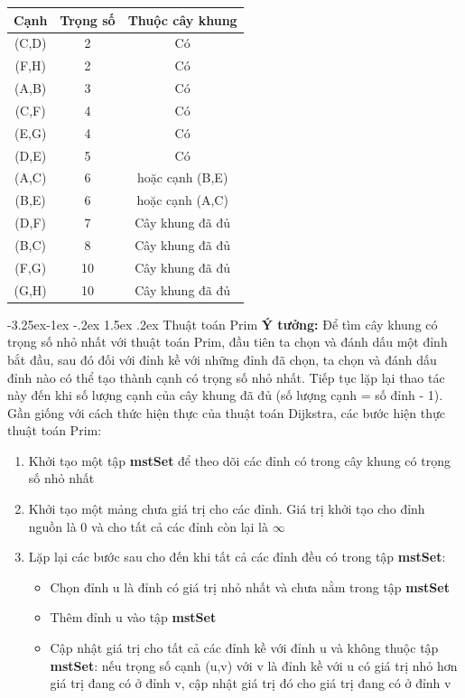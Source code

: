 \documentclass[a4paper]{article}
\makeatletter
\newcounter {subsubsubsection}[subsubsection]
\newcommand\subsubsubsection{\@startsection{subsubsubsection}{4}{\z@}%
                                     {-3.25ex\@plus -1ex \@minus -.2ex}%
                                     {1.5ex \@plus .2ex}%
                                     {\normalfont\normalsize\bfseries}}
\makeatother
\begin{document}
\begin{center}
\begin{tabular}{||c c c||} 
 \hline
Cạnh & Trọng số & Thuộc cây khung  \\ [0.5ex] 
 \hline\hline
 (C,D) & 2 & Có \\ 
 \hline
 (F,H) & 2 & Có\\
 \hline
 (A,B) & 3 & Có\\
 \hline
 (C,F) & 4 & Có\\
 \hline
 (E,G) & 4 & Có\\
 \hline
 (D,E) & 5 & Có\\
 \hline
 (A,C) & 6 & hoặc cạnh (B,E)\\
 \hline
 (B,E) & 6 & hoặc cạnh (A,C)\\
 \hline
 (D,F) & 7 & Cây khung đã đủ\\
 \hline
 (B,C) & 8 & Cây khung đã đủ\\
 \hline
 (F,G) & 10 & Cây khung đã đủ\\
 \hline
 (G,H) & 10 & Cây khung đã đủ\\

 \hline
\end{tabular}
\end{center}
            \subsubsubsection{Thuật toán Prim}
\textbf{Ý tưởng:} Để tìm cây khung có trọng số nhỏ nhất với thuật toán Prim, đầu tiên ta chọn và đánh dấu một đỉnh bắt đầu, sau đó đối với đỉnh kề với những đỉnh đã chọn, ta chọn và đánh dấu đỉnh nào có thể tạo thành cạnh có trọng số nhỏ nhất. Tiếp tục lặp lại thao tác này đến khi số lượng cạnh của cây khung đã đủ (số lượng cạnh = số đỉnh - 1). Gần giống với cách thức hiện thực của thuật toán Dijkstra, các bước hiện thực thuật toán Prim:
\begin{enumerate}
    \item Khởi tạo một tập \textbf{mstSet} để theo dõi các đỉnh có trong cây khung có trọng số nhỏ nhất
    \item Khởi tạo một mảng chưa giá trị cho các đỉnh. Giá trị khởi tạo cho đỉnh nguồn là 0 và cho tất cả các đỉnh còn lại là $\infty$
    \item Lặp lại các bước sau cho đến khi tất cả các đỉnh đều có trong tập \textbf{mstSet}:
    \begin{itemize}
        \item Chọn đỉnh u là đỉnh có giá trị nhỏ nhất và chưa nằm trong tập \textbf{mstSet}
        \item Thêm đỉnh u vào tập \textbf{mstSet}
        \item Cập nhật giá trị cho tất cả các đỉnh kề với đỉnh u và không thuộc tập \textbf{mstSet}: nếu trọng số cạnh (u,v) với v là đỉnh kề với u có giá trị nhỏ hơn giá trị đang có ở đỉnh v, cập nhật giá trị đó cho giá trị đang có ở đỉnh v
    \end{itemize}
\end{enumerate}
\end{document}
